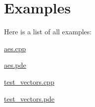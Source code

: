 \section{Examples}
Here is a list of all examples\+:\begin{DoxyCompactItemize}
\item 
\hyperlink{aes_8cpp-example}{aes.\+cpp}
\item 
\hyperlink{aes_8pde-example}{aes.\+pde}
\item 
\hyperlink{test_vectors_8cpp-example}{test\+\_\+vectors.\+cpp}
\item 
\hyperlink{test_vectors_8pde-example}{test\+\_\+vectors.\+pde}
\end{DoxyCompactItemize}
